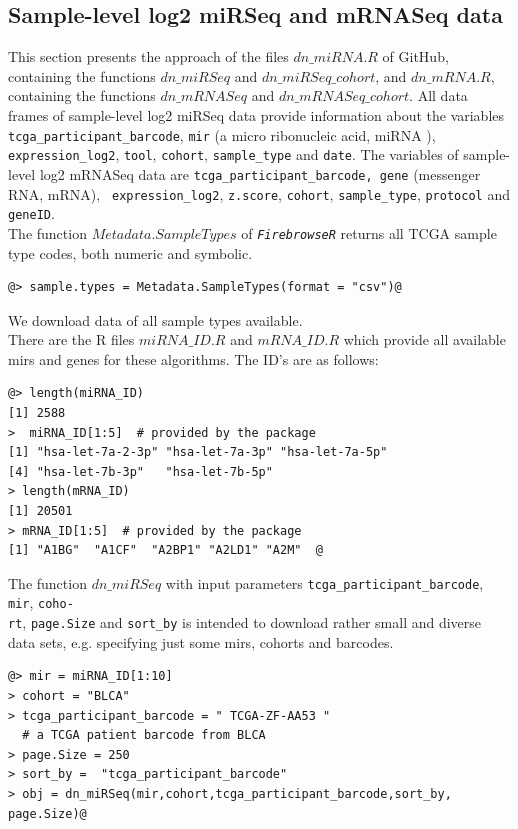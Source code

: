 \documentclass{TechReport}
\begin{document}
\subsection{Sample-level log2 miRSeq and mRNASeq data}
This section presents the approach of the files $dn\_miRNA.R$ of GitHub, containing
the functions $dn\_miRSeq$ and $dn\_miRSeq\_cohort$, and $dn\_mRNA.R$, 
containing the functions $dn\_mRNASeq$ and $dn\_mRNASeq\_cohort$. All data frames of
sample-level log2 miRSeq data provide information about the 
variables {\tt tcga\_participant\_barcode}, {\tt mir} (a micro ribonucleic acid,
miRNA ), {\tt expression\_log2}, {\tt tool}, {\tt cohort}, {\tt sample\_type} and
{\tt date}. The variables of sample-level log2 
mRNASeq data are {\tt tcga\_participant\_barcode, gene} (messenger RNA, mRNA), {\tt
expression\_log2}, {\tt z.score}, {\tt cohort}, {\tt sample\_type}, 
{\tt protocol} and {\tt geneID}.\\
The function $Metadata.SampleTypes$ of \texttt{\em FirebrowseR} returns all TCGA
sample type codes, both numeric and symbolic.
\begin{lstlisting}[style=base]
@> sample.types = Metadata.SampleTypes(format = "csv")@
 \end{lstlisting}
We download data of all sample types available.\\
There are the R files $miRNA\_ID.R$ and $mRNA\_ID.R$ which provide all available
mirs and genes for these algorithms. The ID's are as follows:
\begin{lstlisting}[style=base]
@> length(miRNA_ID)
[1] 2588
>  miRNA_ID[1:5]  # provided by the package
[1] "hsa-let-7a-2-3p" "hsa-let-7a-3p" "hsa-let-7a-5p" 
[4] "hsa-let-7b-3p"   "hsa-let-7b-5p"         
> length(mRNA_ID)
[1] 20501
> mRNA_ID[1:5]  # provided by the package
[1] "A1BG"  "A1CF"  "A2BP1" "A2LD1" "A2M"  @
\end{lstlisting}
The function $dn\_miRSeq$ with input parameters  {\tt tcga\_participant\_barcode},
{\tt mir}, {\tt coho-}\\ {\tt rt}, {\tt page.Size} and {\tt sort\_by} is intended to download 
rather small and diverse data sets, e.g. specifying just some mirs, cohorts and
barcodes.
\begin{lstlisting}[style=base]
@> mir = miRNA_ID[1:10]
> cohort = "BLCA"
> tcga_participant_barcode = " TCGA-ZF-AA53 "  
  # a TCGA patient barcode from BLCA
> page.Size = 250 
> sort_by =  "tcga_participant_barcode"
> obj = dn_miRSeq(mir,cohort,tcga_participant_barcode,sort_by, 
page.Size)@
\end{lstlisting}
\end{document}
